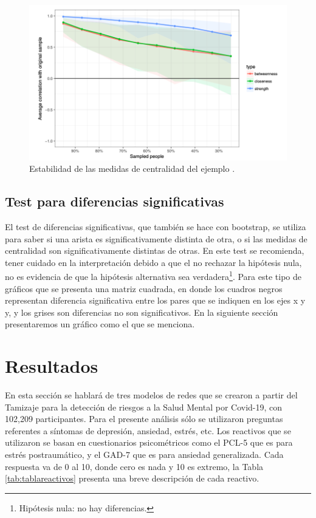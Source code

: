 \documentclass[11pt,spanish]{article}\usepackage[]{graphicx}\usepackage[]{color}
\begin{document}
\begin{figure}[!ht]
\centering
\includegraphics[scale=0.5]{images/estabilidad_tutorial}
\caption{Estabilidad de las medidas de centralidad del ejemplo \cite{main_tutorial}.}
\label{fig:estabilidad_tutorial}
\end{figure}

\subsection{Test para diferencias significativas}

El test de diferencias significativas, que también se hace con bootstrap, se utiliza para saber si una arista es significativamente distinta de otra, o si las medidas de centralidad son significativamente distintas de otras. En este test se recomienda, tener cuidado en la interpretación debido a que el no rechazar la hipótesis nula, no es evidencia de que la hipótesis alternativa sea verdadera\footnote{Hipótesis nula: no hay diferencias.}. Para este tipo de gráficos que se presenta una matriz cuadrada, en donde los cuadros negros representan diferencia significativa entre los pares que se indiquen en los ejes x y y, y los grises son diferencias no son significativos. En la siguiente sección presentaremos un gráfico como el que se menciona. 

\newpage

\section{Resultados}

En esta sección se hablará de tres modelos de redes que se crearon a partir del Tamizaje para la detección de riesgos a la Salud Mental por Covid-19, con 102,209 participantes. Para el presente análisis sólo se utilizaron preguntas referentes a síntomas de depresión, ansiedad, estrés, etc. Los reactivos que se utilizaron se basan en cuestionarios psicométricos como el PCL-5 que es para estrés postraumático, y el GAD-7 que es para ansiedad generalizada. Cada respuesta va de 0 al 10, donde cero es nada y 10 es extremo, la Tabla \ref{tab:tablareactivos} presenta una breve descripción de cada reactivo. 
\vspace{0.5cm}
\end{document}
